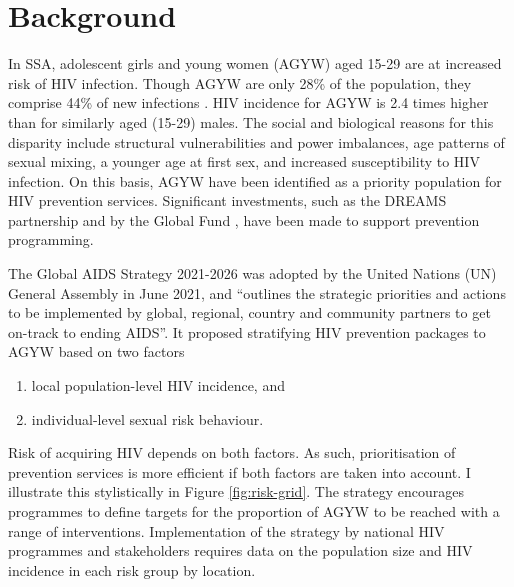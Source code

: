 \documentclass[a4paper, nobind]{templates/ociamthesis}
\providecommand{\tightlist}{%
  \setlength{\itemsep}{0pt}\setlength{\parskip}{0pt}}
\begin{document}
\hypertarget{background-1}{%
\section{Background}\label{background-1}}

In SSA, adolescent girls and young women (AGYW) aged 15-29 are at increased risk of HIV infection.
Though AGYW are only 28\% of the population, they comprise 44\% of new infections \autocite{unaids2021update}.
HIV incidence for AGYW is 2.4 times higher than for similarly aged (15-29) males.
The social and biological reasons for this disparity include structural vulnerabilities and power imbalances, age patterns of sexual mixing, a younger age at first sex, and increased susceptibility to HIV infection.
On this basis, AGYW have been identified as a priority population for HIV prevention services.
Significant investments, such as the DREAMS partnership \autocite{saul2018dreams} and by the Global Fund \autocite{global2018measurement}, have been made to support prevention programming.

The Global AIDS Strategy 2021-2026 \autocite{unaids2021global} was adopted by the United Nations (UN) General Assembly in June 2021, and ``outlines the strategic priorities and actions to be implemented by global, regional, country and community partners to get on-track to ending AIDS''.
It proposed stratifying HIV prevention packages to AGYW based on two factors

\begin{enumerate}
\def\labelenumi{\arabic{enumi}.}
\tightlist
\item
  local population-level HIV incidence, and
\item
  individual-level sexual risk behaviour.
\end{enumerate}

Risk of acquiring HIV depends on both factors.
As such, prioritisation of prevention services is more efficient if both factors are taken into account.
I illustrate this stylistically in Figure \ref{fig:risk-grid}.
The strategy encourages programmes to define targets for the proportion of AGYW to be reached with a range of interventions.
Implementation of the strategy by national HIV programmes and stakeholders requires data on the population size and HIV incidence in each risk group by location.
\end{document}
